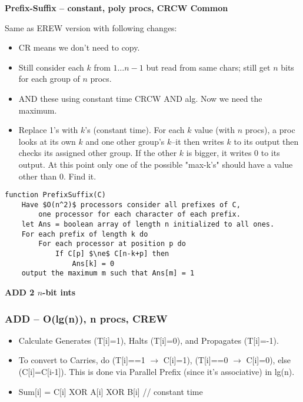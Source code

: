 \documentclass[12pt]{article}
\providecommand{\tightlist}{
    \setlength{\itemsep}{0pt}\setlength{\parskip}{0pt}
}
\begin{document}
\begin{centering}\textbf{Prefix-Suffix -- constant, poly procs, CRCW Common}\par\end{centering}
Same as EREW version with following changes:\\
\begin{itemize}\tightlist
  \item CR means we don't need to copy.
  \item Still consider each $k$ from $1 \dots n-1$ but read from same chars; still get $n$ bits for each group of $n$ procs.
  \item AND these using constant time CRCW AND alg. Now we need the maximum.
  \item Replace 1's with $k$'s (constant time). For each $k$ value (with $n$ procs), a proc looks at its own $k$ and one other group's $k$--it then writes $k$ to its output then checks its assigned other group. If the other $k$ is bigger, it writes 0 to its output. At this point only one of the possible "max-k's" should have a value other than 0. Find it.
\end{itemize}
\begin{lstlisting}
function PrefixSuffix(C)
    Have $O(n^2)$ processors consider all prefixes of C,
        one processor for each character of each prefix.
    let Ans = boolean array of length n initialized to all ones.
    For each prefix of length k do
        For each processor at position p do
            If C[p] $\ne$ C[n-k+p] then
                Ans[k] = 0
    output the maximum m such that Ans[m] = 1
\end{lstlisting}


\begin{centering}\textbf{ADD 2 $n$-bit ints}\par\end{centering}
\subsubsection*{ADD -- O(lg(n)), n procs, CREW}
\begin{itemize}\tightlist
  \item Calculate Generates (T[i]=1), Halts (T[i]=0), and Propagates (T[i]=-1).
  \item To convert to Carries, do (T[i]==1 $\rightarrow$ C[i]=1), (T[i]==0 $\rightarrow$ C[i]=0), else (C[i]=C[i-1]).
  This is done via Parallel Prefix (since it's associative) in lg(n).
  \item Sum[i] = C[i] XOR A[i] XOR B[i]   // constant time
\end{itemize}
\end{document}
